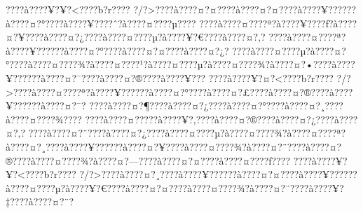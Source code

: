 \documentclass[11pt, openany]{book}
\begin{document}
???\textbar{}?à???\textbar{}?¥?¥?\textless{}???\textbar{}?b?r???\textbar{}?
?/?\textgreater{}???\textbar{}?à???\textbar{}?¤?¤???\textbar{}?à???\textbar{}?¤?¤???\textbar{}?à???\textbar{}?¥?????\textbar{}?à???\textbar{}?¤?°???\textbar{}?à???\textbar{}?¥???\textbar{}?ˆ?à???\textbar{}?¤???\textbar{}?µ???\textbar{}?
???\textbar{}?à???\textbar{}?¤???\textbar{}?ª?à???\textbar{}?¥???\textbar{}?ƒ?à???\textbar{}?¤?¥???\textbar{}?à???\textbar{}?¤?¿???\textbar{}?à???\textbar{}?¤???\textbar{}?µ?à???\textbar{}?¥?€???\textbar{}?à???\textbar{}?¤?‚?
???\textbar{}?à???\textbar{}?¤???\textbar{}?ª?à???\textbar{}?¥?????\textbar{}?à???\textbar{}?¤?°???\textbar{}?à???\textbar{}?¤?¤???\textbar{}?à???\textbar{}?¤?¿?
???\textbar{}?à???\textbar{}?¤???\textbar{}?µ?à???\textbar{}?¤?°???\textbar{}?à???\textbar{}?¤???\textbar{}?¾?à???\textbar{}?¤???\textbar{}?¹?à???\textbar{}?¤???\textbar{}?µ?à???\textbar{}?¤???\textbar{}?¾?à???\textbar{}?¤?•???\textbar{}?à???\textbar{}?¥?????\textbar{}?à???\textbar{}?¤?¯???\textbar{}?à???\textbar{}?¤?®???\textbar{}?à???\textbar{}?¥???
???\textbar{}?à???\textbar{}?¥?¤?\textless{}???\textbar{}?b?r???\textbar{}?
?/?\textgreater{}???\textbar{}?à???\textbar{}?¤???\textbar{}?ª?à???\textbar{}?¥?????\textbar{}?à???\textbar{}?¤?°???\textbar{}?à???\textbar{}?¤?£???\textbar{}?à???\textbar{}?¤?®???\textbar{}?à???\textbar{}?¥?????\textbar{}?à???\textbar{}?¤?¯?
???\textbar{}?à???\textbar{}?¤?¶???\textbar{}?à???\textbar{}?¤?¿???\textbar{}?à???\textbar{}?¤?°???\textbar{}?à???\textbar{}?¤?¸???\textbar{}?à???\textbar{}?¤???\textbar{}?¾???\textbar{}?
???\textbar{}?à???\textbar{}?¤?­???\textbar{}?à???\textbar{}?¥?‚???\textbar{}?à???\textbar{}?¤?®???\textbar{}?à???\textbar{}?¤?¿???\textbar{}?à???\textbar{}?¤?‚?
???\textbar{}?à???\textbar{}?¤?¨???\textbar{}?à???\textbar{}?¤?¿???\textbar{}?à???\textbar{}?¤???\textbar{}?µ?à???\textbar{}?¤???\textbar{}?¾?à???\textbar{}?¤???\textbar{}?ª?à???\textbar{}?¤?¸???\textbar{}?à???\textbar{}?¥?????\textbar{}?à???\textbar{}?¤?¥???\textbar{}?à???\textbar{}?¤???\textbar{}?¾?à???\textbar{}?¤?¨???\textbar{}?à???\textbar{}?¤?®???\textbar{}?à???\textbar{}?¤???\textbar{}?¾?à???\textbar{}?¤?---???\textbar{}?à???\textbar{}?¤?¤???\textbar{}?à???\textbar{}?¤???\textbar{}?ƒ???\textbar{}?
???\textbar{}?à???\textbar{}?¥?¥?\textless{}???\textbar{}?b?r???\textbar{}?
?/?\textgreater{}???\textbar{}?à???\textbar{}?¤?¸???\textbar{}?à???\textbar{}?¥?????\textbar{}?à???\textbar{}?¤?¤???\textbar{}?à???\textbar{}?¥?????\textbar{}?à???\textbar{}?¤???\textbar{}?µ?à???\textbar{}?¥?€???\textbar{}?à???\textbar{}?¤?¤???\textbar{}?à???\textbar{}?¤???\textbar{}?¾?à???\textbar{}?¤?¨???\textbar{}?à???\textbar{}?¥?‡???\textbar{}?à???\textbar{}?¤?¨?
\end{document}
